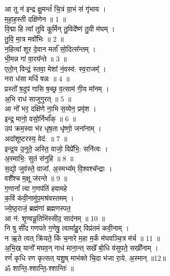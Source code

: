 \section{}
आ तू न॑ इन्द्र क्षु॒मन्तं᳚ चि॒त्रं ग्रा॒भं सं गृ॑भाय ।\\
म॒हा॒ह॒स्ती दक्षि॑णेन ॥ 1 ॥\\
वि॒द्मा हि त्वा᳚ तुवि कू॒र्मिन् तु॒विदे᳚ष्णं तु॒वी म॑घम् ।\\
तु॒वि॒ मा॒त्र मवो᳚भिः ॥ 2 ॥\\
न॒हित्वा᳚ शूर दे॒वान मर्ता᳚ सो॒दित्स᳚न्तम् ।\\
भी॒मन्न गां वा॒रय᳚न्ते ॥ 3 ॥\\
एतो॒न् विन्द्रं॒ स्तवा॒ मेशा᳚ नं॒वस्व॑: स्व॒राजम्᳚ ।\\
नरा ध॑सा मर्धि षन्नः ॥ 4 ॥\\
प्रस्तो᳚ ष॒दुप॑ गासि ष॒च्छ्र व॒त्साम॑ गी॒य मा᳚नम् ।\\
अ॒भि राध॑ साजुगुरत् ॥ 5 ॥\\
आ नो᳚ भर॒ दक्षि॑णे ना॒भि स॒व्येन॒ प्रमृ॑श ।\\
इन्द्र॒ मानो॒ वसो॒र्निर्भा᳚क् ॥ 6 ॥\\
उप॑ क्रम॒स्वा भ॑र धृष॒ता धृ॑ष्णो॒ जना᳚नाम् ।\\
अदा᳚शूष्टरस्य॒ वेद॑: ॥ 7 ॥\\
इन्द्र॒य उ॒नुते॒ अस्ति॒ वाजो॒ विप्रे᳚भि॒: सनि॑त्वः ।\\
अ॒स्माभि॒: सुतं स॑नुहि ॥ 8 ॥\\
स॒द्यो॒ जुव॑स्ते॒ वाजा᳚, अ॒स्मभ्य᳚म् वि॒श्वश्च᳚न्द्राः ।\\
वशै᳚श्च म॒क्षू ज॑रन्ते ॥ 9 ॥\\
ग॒णानां᳚ त्वा ग॒णप॑तिं हवामहे\\
क॒विं क॑वी॒नामु॑प॒मश्र॑वस्तमम् ।\\
ज्ये॒ष्ठ॒राजं॒ ब्रह्म॑णां ब्रह्मणस्पत॒\\
आ न॑: शृ॒ण्वन्नू॒तिभि॑स्सीद॒ साद॑नम् ॥ 10 ॥\\
नि षु सी᳚द गणपते ग॒णेषु॒ त्वामा᳚हु॒र् विप्र॑तमं कवी॒नाम् ।\\
न ऋ॒ते त्वत् क्रि॑यते॒ किं च॒नारे म॒हा म॒र्कं म॑घवञ्चि॒त्र म॑र्च ॥ 11 ॥\\
अ॒भि॒ख् यानो᳚ मघव॒न् नाध॑ माना॒न्त् सखे᳚ बो॒धि व॑सुपते॒ सखी᳚नाम् ।\\
रणं᳚ कृधि रण कृत्सत् यशु॒ष् माभ॑क्ते चि॒दा भ॑जा रा॒ये, अ॒स्मान् ॥12॥\\
ॐ शान्ति॒-श्शान्ति॒-श्शान्तिः॑ ॥\\
